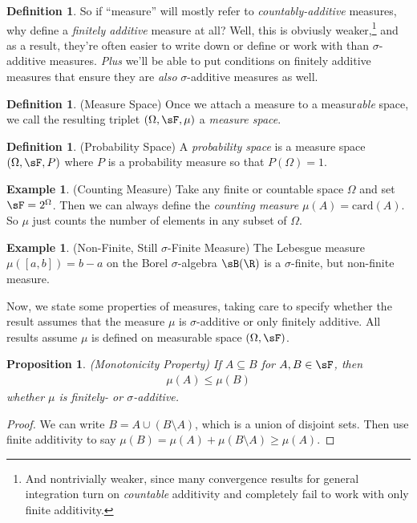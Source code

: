 \documentclass[12pt]{article}
\theoremstyle{plain}
\newtheorem{prop}[thm]{Proposition}
\theoremstyle{definition}
\newtheorem{defn}[thm]{Definition}
\newtheorem{ex}[thm]{Example}
\theoremstyle{remark}
\begin{document}
\begin{defn}
So if ``measure'' will mostly refer to \emph{countably-additive}
measures, why define a \emph{finitely additive} measure at all?
Well, this is obviusly weaker,\footnote{%
  And nontrivially weaker, since many convergence results
  for general integration turn on \emph{countable} additivity and
  completely fail to work with only finite additivity.
}
and as a result, they're often easier to write down or define or work
with than $\sigma$-additive measures. \emph{Plus} we'll be able to put
conditions on finitely additive measures that ensure they are
\emph{also} $\sigma$-additive measures as well.
\end{defn}
\clearpage

\begin{defn}(Measure Space)
Once we attach a measure to a measur\emph{able} space, we call the
resulting triplet $(\Omega,\sF,\mu)$ a \emph{measure space}.
\end{defn}

\begin{defn}(Probability Space)
A \emph{probability space} is a measure space $(\Omega,\sF,P)$ where $P$
is a probability measure so that $P(\Omega)=1$.
\end{defn}

\begin{ex}(Counting Measure)
Take any finite or countable space $\Omega$ and set
$\sF=2^\Omega$. Then we can always define the
\emph{counting measure} $\mu(A) = \text{card}(A)$.  So $\mu$ just counts
the number of elements in any subset of $\Omega$.
\end{ex}

\begin{ex}(Non-Finite, Still $\sigma$-Finite Measure)
The Lebesgue measure $\mu([a,b])=b-a$ on the Borel $\sigma$-algebra
$\sB(\R)$ is a $\sigma$-finite, but non-finite measure.
\end{ex}


Now, we state some properties of measures, taking care to specify
whether the result assumes that the measure $\mu$ is $\sigma$-additive
or only finitely additive. All results assume $\mu$ is defined on
measurable space $(\Omega,\sF)$.

\begin{prop}\emph{(Monotonicity Property)}
If $A\subseteq B$ for $A,B\in\sF$, then
\begin{align*}
  \mu(A) \leq \mu(B)
\end{align*}
whether $\mu$ is finitely- or $\sigma$-additive.
\end{prop}
\begin{proof}
We can write $B = A \cup (B\setminus A)$, which is a union of disjoint
sets. Then use finite additivity to say $\mu(B) = \mu(A) +
\mu(B\setminus A) \geq \mu(A)$.
\end{proof}
\end{document}
